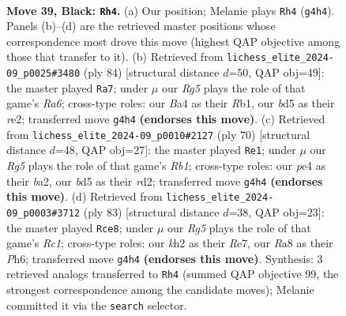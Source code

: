 \documentclass[11pt]{article}
\begin{document}
\clearpage

\begin{figure}[p]\centering
\begin{subfigure}{0.46\textwidth}\centering
\resizebox{\linewidth}{!}{%
\newchessgame
\chessboard[
  setfen={r7/pp3p2/6k1/3B3p/bP2P1r1/P6p/7K/R4R2 b - - 5 39},
  showmover=false,
  pgfstyle=straightmove, color=movearrow, markmove={g4-h4}
]}
\caption{}
\end{subfigure}\hfill
\begin{subfigure}{0.46\textwidth}\centering
\resizebox{\linewidth}{!}{%
\newchessgame
\chessboard[
  setfen={2r3k1/8/R3p1B1/3b1pP1/3p4/2p3bP/4r1P1/1R5K w - - 0 43},
  showmover=false,
  pgfstyle=straightmove, color=movearrow, markmove={a6-a7}
]}
\caption{}
\end{subfigure}
\\[4pt]
\begin{subfigure}{0.46\textwidth}\centering
\resizebox{\linewidth}{!}{%
\newchessgame
\chessboard[
  setfen={6k1/1R3p2/1p4p1/1P6/3P3P/2r3P1/b2r1PB1/1R4K1 w - - 2 36},
  showmover=false,
  pgfstyle=straightmove, color=movearrow, markmove={b1-e1}
]}
\caption{}
\end{subfigure}\hfill
\begin{subfigure}{0.46\textwidth}\centering
\resizebox{\linewidth}{!}{%
\newchessgame
\chessboard[
  setfen={2r3k1/4rpp1/7p/3BB3/4R1Pb/7P/8/5R1K b - - 4 42},
  showmover=false,
  pgfstyle=straightmove, color=movearrow, markmove={c8-e8}
]}
\caption{}
\end{subfigure}
\caption{\textbf{Move 39, Black: \texttt{Rh4}.} (a) Our position; Melanie plays \texttt{Rh4} (\texttt{g4h4}). Panels (b)--(d) are the retrieved master positions whose correspondence most drove this move (highest QAP objective among those that transfer to it). (b) Retrieved from \texttt{lichess\_elite\_2024-09\_p0025\#3480} (ply 84) [structural distance $d$=50, QAP obj=49]: the master played \texttt{Ra7}; under $\mu$ our \emph{Rg5} plays the role of that game's \emph{Ra6}; cross-type roles: our \emph{B}a4 as their \emph{R}b1, our \emph{b}d5 as their \emph{r}e2; transferred move \texttt{g4h4} \textbf{(endorses this move)}. (c) Retrieved from \texttt{lichess\_elite\_2024-09\_p0010\#2127} (ply 70) [structural distance $d$=48, QAP obj=27]: the master played \texttt{Re1}; under $\mu$ our \emph{Rg5} plays the role of that game's \emph{Rb1}; cross-type roles: our \emph{p}e4 as their \emph{b}a2, our \emph{b}d5 as their \emph{r}d2; transferred move \texttt{g4h4} \textbf{(endorses this move)}. (d) Retrieved from \texttt{lichess\_elite\_2024-09\_p0003\#3712} (ply 83) [structural distance $d$=38, QAP obj=23]: the master played \texttt{Rce8}; under $\mu$ our \emph{Rg5} plays the role of that game's \emph{Rc1}; cross-type roles: our \emph{k}h2 as their \emph{R}e7, our \emph{R}a8 as their \emph{P}h6; transferred move \texttt{g4h4} \textbf{(endorses this move)}. Synthesis: 3 retrieved analogs transferred to \texttt{Rh4} (summed QAP objective 99, the strongest correspondence among the candidate moves); Melanie committed it via the \texttt{search} selector.}
\label{fig:thought-m77}
\end{figure}
\end{document}
